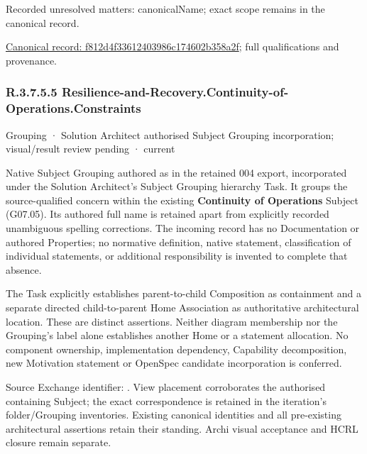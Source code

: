 {\small Recorded unresolved matters: canonicalName; exact scope remains in the canonical record.}\par
{\footnotesize \href{../../../../continuum/grouping/f812d4f33612403986c174602b358a2f.md}{Canonical record: f812d4f33612403986c174602b358a2f}; full qualifications and provenance.}\par
\subsubsection*{R.3.7.5.5 Resilience-and-Recovery.Continuity-of-Operations.Constraints}
\label{navigation:R.3.7.5.5}

\label{element:5e78ed0ddec14bb4b081082c66c75ad2}
{\small Grouping · Solution Architect authorised Subject Grouping incorporation; visual/result review pending · current}\par

Native Subject Grouping authored as \texttt{} in the retained 004 export,
incorporated under the Solution Architect's Subject Grouping hierarchy Task.
It groups the source-qualified \texttt{} concern within
the existing \textbf{Continuity of Operations} Subject (G07.05). Its authored full name
is retained apart from explicitly recorded unambiguous spelling corrections.
The incoming record has no Documentation or authored Properties; no normative
definition, native statement, classification of individual statements, or
additional responsibility is invented to complete that absence.



The Task explicitly establishes parent-to-child Composition as containment and
a separate directed child-to-parent Home Association as authoritative architectural
location. These are distinct assertions. Neither diagram membership nor the
Grouping's label alone establishes another Home or a statement allocation.
No component ownership, implementation dependency, Capability decomposition,
new Motivation statement or OpenSpec candidate incorporation is conferred.



Source Exchange identifier: \texttt{}. View placement corroborates
the authorised containing Subject; the exact correspondence is retained in the
iteration's folder/Grouping inventories. Existing canonical identities and all
pre-existing architectural assertions retain their standing. Archi visual
acceptance and HCRL closure remain separate.


